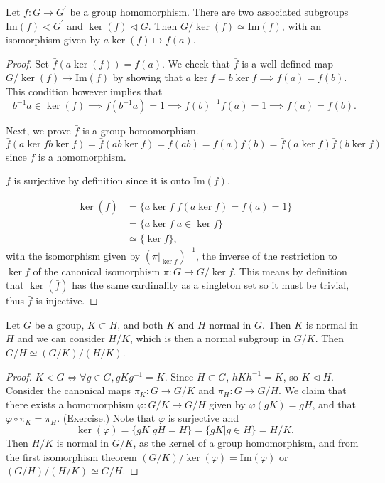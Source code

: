 \documentclass{article}
\begin{document}
\begin{theorem}
Let $f : G \to G^\prime$ be a group homomorphism. There are two
associated subgroups $\mathrm{Im}(f) < G^\prime$ and 
$\ker(f) \triangleleft G$. Then
$G / \ker(f) \simeq \mathrm{Im}(f)$, with an isomorphism given by
$a \ker(f) \mapsto f(a)$.
\end{theorem}
\begin{proof}
Set $\bar{f}(a \ker (f)) = f(a)$. We check that $\bar{f}$ is a
well-defined map $G / \ker(f) \to \mathrm{Im}(f)$ by showing that
$a \ker f = b \ker f \implies f(a) = f(b)$. This condition however
implies that 
$$
b^{-1} a \in \ker(f) 
  \implies f(b^{-1} a) = 1
  \implies f(b)^{-1} f(a) = 1
  \implies f(a) = f(b).
$$

Next, we prove $\bar{f}$ is a group homomorphism.
$$
\bar{f}(a \ker f b \ker f) 
  = \bar{f} (a b \ker f) 
  = f(ab) 
  = f(a)f(b)
  = \bar{f}(a \ker f) \bar{f}(b \ker f)
$$
since $f$ is a homomorphism.

$\bar{f}$ is surjective by definition since it is onto
$\mathrm{Im}(f)$.

\begin{align*}
\ker(\bar{f}) & = \{ a \ker f | \bar{f}(a \ker f) = f(a) = 1 \} \\
              & = \{ a \ker f | a \in \ker f \} \\
              & \simeq \{ \ker f \},
\end{align*}
with the isomorphism given by 
$\left(\pi|_{\ker f}\right)^{-1}$,
the inverse of the restriction to $\ker f$ 
of the canonical isomorphism $\pi : G \to G / \ker f$.
This means by definition that $\ker(\bar{f})$ has the same cardinality
as a singleton set so it must be trivial, thus $\bar{f}$ is injective.
\end{proof}

\begin{theorem}
Let $G$ be a group, $K \subset H$, and both $K$ and $H$ normal in
$G$. Then $K$ is normal in $H$ and we can consider $H / K$, which is
then a normal subgroup in $G / K$. Then $G / H \simeq (G / K) / (H / K)$.
\end{theorem}
\begin{proof}
$K \triangleleft G \iff \forall g \in G, g K g^{-1} = K$. Since
$H \subset G$, $h K h^{-1} = K$, so $K \triangleleft H$. Consider the
canonical maps $\pi_K : G \to G / K$ and
$\pi_H : G \to G / H$. We claim that there exists a homomorphism
$\varphi : G / K \to G / H$ given by $\varphi(gK) = gH$, and that
$\varphi \circ \pi_K = \pi_H$. (Exercise.) Note that $\varphi$ is
surjective and 
$$
\ker(\varphi) 
  = \{ gK | gH = H \} 
  = \{ gK | g \in H \}
  = H / K.
$$
Then $H / K$ is normal in $G / K$, as the kernel of a group
homomorphism, and from the first isomorphism theorem
$(G / K) / \ker(\varphi) = \mathrm{Im}(\varphi)$
or $(G / H) / (H / K) \simeq G / H$.
\end{proof}
\end{document}
